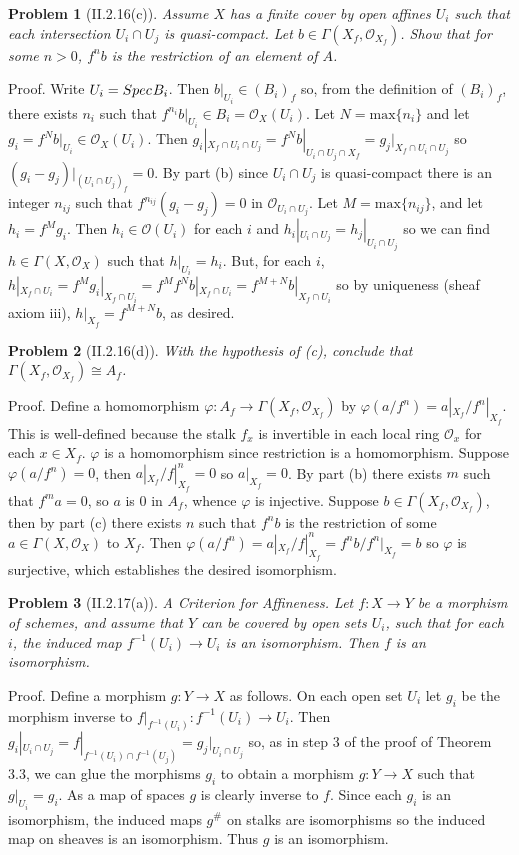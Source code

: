 \documentclass[12pt]{article}
\newcommand{\so}{\mathcal{O}}
\newtheorem{prob}{Problem}
\renewcommand{\phi}{\varphi}
\newcommand{\spec}{Spec \hspace{.01in}}
\newcommand{\proof}{\mbox{\sc Proof.\hspace{.1in}}}
\begin{document}
\begin{prob}[II.2.16(c)]
Assume $X$ has a finite cover by open affines $U_{i}$ such that
each intersection $U_i\cap{}U_j$ is quasi-compact. Let
$b\in\Gamma(X_f,\so_{X_f})$. Show that for some $n>0$, 
$f^n b$ is the restriction of an element of $A$. 
\end{prob}
\proof
Write $U_i=\spec B_i$. Then $b|_{U_i}\in{}(B_i)_f$ so,
from the definition of $(B_i)_f$, there exists $n_i$
such that $f^{n_i}b|_{U_i}\in{}B_i=\so_X(U_i)$. 
Let $N=\mbox{max}\{n_i\}$ and let $g_i=f^{N}b|_{U_i}\in\so_X(U_i).$
Then $g_i|_{X_f\cap{}U_i\cap{}U_j}=
f^{N}b|_{U_i\cap{}U_j\cap{}X_f}=
g_j|_{X_f\cap{}U_i\cap{}U_j}$
so $(g_i-g_j)|_{(U_i\cap{}U_j)_f}=0$.
By part (b) since $U_i\cap{}U_j$ is quasi-compact there is an integer
$n_{ij}$ such that $f^{n_{ij}}(g_i-g_j)=0$ in 
$\so_{U_i\cap{}U_j}$. Let $M=\mbox{max}\{n_{ij}\}$, and let
$h_i=f^{M}g_i.$ Then $h_i\in\so(U_i)$ for each $i$ and 
$h_i|_{U_i\cap{}U_j}=h_j|_{U_i\cap{}U_j}$
so we can find $h\in\Gamma(X,\so_X)$ such that
$h|_{U_i}=h_i$. But, for each $i$,
$h|_{X_f\cap{}U_i}=f^{M}g_i|_{X_f\cap{}U_i}=f^{M}f^{N}b|_{X_f\cap{}U_i}
=f^{M+N}b|_{X_f\cap{}U_i}$ so by uniqueness (sheaf axiom iii),
$h|_{X_f}=f^{M+N}b$, as desired. 

\begin{prob}[II.2.16(d)]
With the hypothesis of (c), conclude that 
$\Gamma(X_f,\so_{X_f})\cong{}A_f$. 
\end{prob}
\proof
Define a homomorphism $\phi:A_f\rightarrow\Gamma(X_f,\so_{X_f})$ by
$\phi(a/f^n)=a|_{X_f}/f^n|_{X_f}$. This is well-defined because the
stalk $f_x$ is invertible in each local ring $\so_{x}$ for each
$x\in{}X_{f}$. $\phi$ is a homomorphism since restriction is
a homomorphism. Suppose $\phi(a/f^n)=0$, then 
$a|_{X_f}/f|_{X_f}^n=0$ so $a|_{X_f}=0$. By
part (b) there exists $m$ such that $f^{m}a=0$, so
$a$ is $0$ in $A_f$, whence $\phi$ is injective.
Suppose $b\in\Gamma(X_f,\so_{X_f})$, then by
part (c) there exists $n$ such that $f^n{}b$ is the restriction
of some $a\in\Gamma(X,\so_X)$ to $X_f$. Then 
$\phi(a/f^n)=a|_{X_f}/f|_{X_f}^n=f^n{}b/f^n|_{X_f}=b$ so
$\phi$ is surjective, which establishes the desired
isomorphism.

\begin{prob}[II.2.17(a)]
A Criterion for Affineness. 
Let $f:X\rightarrow{}Y$ be a morphism of schemes, and assume that
$Y$ can be covered by open sets $U_i$, such that for each $i$, the
induced map $f^{-1}(U_i)\rightarrow{}U_i$ is an isomorphism. 
Then $f$ is an isomorphism.
\end{prob}
\proof
Define a morphism $g:Y\rightarrow X$ as follows. On each open set
$U_i$ let $g_i$ be the morphism inverse to 
$f|_{f^{-1}(U_i)}:f^{-1}(U_i)\rightarrow{}U_i$. 
Then 
$g_i|_{U_i\cap{}U_j}=f|_{f^{-1}(U_i)\cap{}f^{-1}(U_j)}
=g_j|_{U_i\cap{}U_j}$ 
so, as in step 3 of the proof of Theorem 3.3, we can glue the morphisms
$g_i$ to obtain a morphism $g:Y\rightarrow X$ such that
$g|_{U_i}=g_i$. As a map of spaces $g$ is clearly inverse to $f$.
Since each $g_i$ is an isomorphism, the induced maps $g^{\#}$ on stalks
are isomorphisms so the induced map on sheaves is an isomorphism.
Thus $g$ is an isomorphism. 

 
\end{document}
